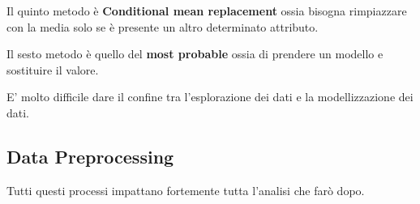 Il quinto metodo è \textbf{Conditional mean replacement} ossia bisogna rimpiazzare con la media solo se è presente un altro determinato attributo.

Il sesto metodo è quello del \textbf{most probable} ossia di prendere un modello e sostituire il valore.

E' molto difficile dare il confine tra l'esplorazione dei dati e la modellizzazione dei dati.

\subsection{Data Preprocessing}

Tutti questi processi impattano fortemente tutta l'analisi che farò dopo.



